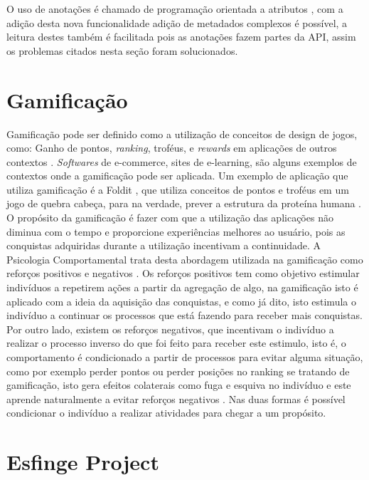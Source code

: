 O uso de anotações é chamado de programação orientada a atributos \cite{buschmann2007pattern}, com a adição desta nova funcionalidade adição de metadados complexos é possível, a leitura destes também é facilitada pois as anotações fazem partes da API, assim os problemas citados nesta seção foram solucionados.

\section{Gamificação}

\par Gamificação pode ser definido como a utilização de conceitos de design de jogos, como: Ganho de pontos, \textit{ranking}, troféus, e \textit{rewards} em aplicações de outros contextos \cite{deterding2011gamification}. \textit{Softwares} de e-commerce, sites de e-learning, são alguns exemplos de contextos onde a gamificação pode ser aplicada. Um exemplo de aplicação que utiliza gamificação é a Foldit \cite{burke2012behind}, que utiliza conceitos de pontos e troféus em um jogo de quebra cabeça, para na verdade, prever a estrutura da proteína humana \cite{deterding2011gamification}. O propósito da gamificação é fazer com que a utilização das aplicações não diminua com o tempo e proporcione experiências melhores ao usuário, pois as conquistas adquiridas durante a utilização incentivam a continuidade. A Psicologia Comportamental trata desta abordagem utilizada na gamificação como reforços positivos e negativos \cite{skinner1990behavior}. Os reforços positivos tem como objetivo estimular indivíduos a repetirem ações a partir da agregação de algo, na gamificação isto é aplicado com a ideia da aquisição das conquistas, e como já dito, isto estimula o indivíduo a continuar os processos que está fazendo para receber mais conquistas. Por outro lado, existem os reforços negativos, que incentivam o indivíduo a realizar o processo inverso do que foi feito para receber este estimulo, isto é, o comportamento é condicionado a partir de processos para evitar alguma situação, como por exemplo perder pontos ou perder posições no ranking se tratando de gamificação, isto gera efeitos colaterais como fuga e esquiva no indivíduo e este aprende naturalmente a evitar reforços negativos \cite{linehan2015gamification}. Nas duas formas é possível condicionar o indivíduo a realizar atividades para chegar a um propósito.

\section{Esfinge Project}

